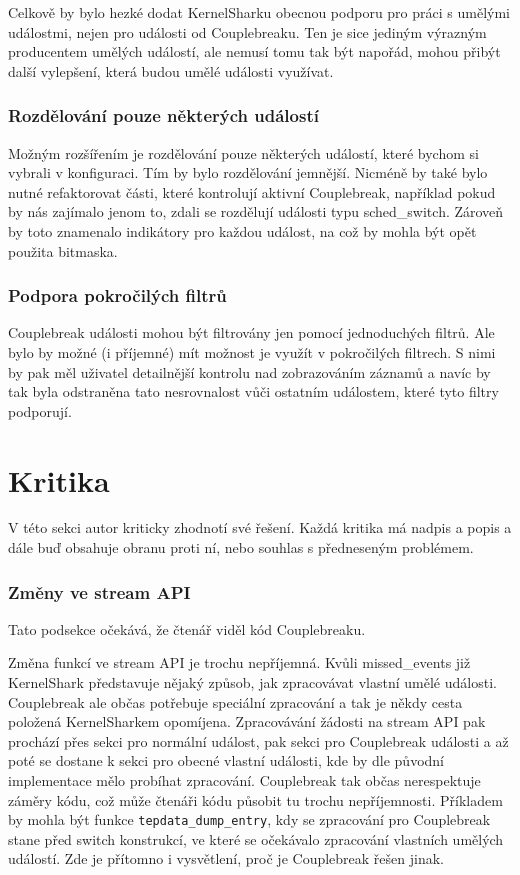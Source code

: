 Celkově by bylo hezké dodat KernelSharku obecnou podporu pro práci s umělými událostmi, nejen pro události od Couplebreaku. Ten je sice jediným výrazným producentem umělých událostí, ale nemusí tomu tak být napořád, mohou přibýt další vylepšení, která budou umělé události využívat.

\subsubsection*{Rozdělování pouze některých událostí}
Možným rozšířením je rozdělování pouze některých událostí, které bychom si vybrali v konfiguraci. Tím by bylo rozdělování jemnější. Nicméně by také bylo nutné refaktorovat části, které kontrolují aktivní Couplebreak, například pokud by nás zajímalo jenom to, zdali se rozdělují události typu sched\_switch. Zároveň by toto znamenalo indikátory pro každou událost, na což by mohla být opět použita bitmaska.

\subsubsection*{Podpora pokročilých filtrů}
Couplebreak události mohou být filtrovány jen pomocí jednoduchých filtrů. Ale bylo by možné (i příjemné) mít možnost je využít v pokročilých filtrech. S nimi by pak měl uživatel detailnější kontrolu nad zobrazováním záznamů a navíc by tak byla odstraněna tato nesrovnalost vůči ostatním událostem, které tyto filtry podporují.

\section{Kritika}
V této sekci autor kriticky zhodnotí své řešení. Každá kritika má nadpis a popis a dále buď obsahuje obranu proti ní, nebo souhlas s předneseným problémem.

\subsubsection*{Změny ve stream API}
Tato podsekce očekává, že čtenář viděl kód Couplebreaku.

Změna funkcí ve stream API je trochu nepříjemná. Kvůli missed\_events již KernelShark představuje nějaký způsob, jak zpracovávat vlastní umělé události. Couplebreak ale občas potřebuje speciální zpracování a tak je někdy cesta položená KernelSharkem opomíjena. Zpracovávání žádosti na stream API pak prochází přes sekci pro normální událost, pak sekci pro Couplebreak události a až poté se dostane k sekci pro obecné vlastní události, kde by dle původní implementace mělo probíhat zpracování. Couplebreak tak občas nerespektuje záměry kódu, což může čtenáři kódu působit tu trochu nepříjemnosti. Příkladem by mohla být funkce \texttt{tepdata\_dump\_entry}, kdy se zpracování pro Couplebreak stane před switch konstrukcí, ve které se očekávalo zpracování vlastních umělých událostí. Zde je přítomno i vysvětlení, proč je Couplebreak řešen jinak.

